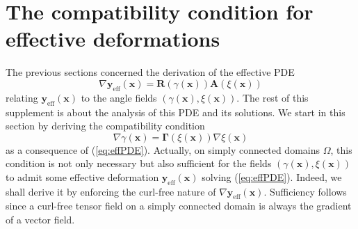 \documentclass[aps,11pt,tightenlines,notitlepage,superscriptaddress,longbibliography,nofootinbib]{revtex4-1}
\begin{document}
  

 
 


\section{The compatibility condition for effective deformations}

The previous sections concerned the derivation of the effective PDE
\begin{equation}\label{eq:effPDE}
    \nabla \mathbf{y}_{\text{eff}}(\mathbf{x}) = \mathbf{R}(\gamma(\mathbf{x})) \mathbf{A}(\xi(\mathbf{x}))
\end{equation}
relating $\mathbf{y}_\text{eff}(\mathbf{x})$ to the angle fields $(\gamma(\mathbf{x}),\xi(\mathbf{x}))$. The rest of this supplement is about the analysis of this PDE and its solutions. We start in this section by deriving the compatibility condition 
\begin{equation}\label{eq:compat1}
\nabla \gamma(\mathbf{x}) = \boldsymbol{\Gamma}(\xi(\mathbf{x})) \nabla \xi(\mathbf{x})  
\end{equation}
as a consequence of (\ref{eq:effPDE}). Actually, on simply connected domains $\Omega$, this condition is not only necessary but also sufficient for the fields $(\gamma(\mathbf{x}),\xi(\mathbf{x}))$ to admit some effective deformation $\mathbf{y}_\text{eff}(\mathbf{x})$ solving (\ref{eq:effPDE}). Indeed, we shall derive it by enforcing the curl-free nature of $\nabla\mathbf{y}_\text{eff}(\mathbf{x})$. Sufficiency follows since a curl-free tensor field on a simply connected domain is always the gradient of a vector field.  %
\end{document}
